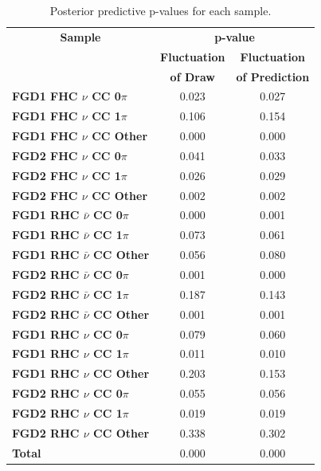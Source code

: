 \begin{center}
\begin{table}
\center
\begin{tabular}{l||c c}
\hline \hline
\multicolumn{1}{c||}{\textbf{Sample}} & \multicolumn{2}{c}{\textbf{p-value}} \\
& \multicolumn{1}{c}{\textbf{Fluctuation}} & \multicolumn{1}{c}{\textbf{Fluctuation}} \\
& \multicolumn{1}{c}{\textbf{of Draw}} & \multicolumn{1}{c}{\textbf{of Prediction}} \\
\hline\hline
\textbf{FGD1 FHC $\nu$ CC 0$\pi$} & 0.023 & 0.027\\ 
\textbf{FGD1 FHC $\nu$ CC 1$\pi$} & 0.106 & 0.154\\
\textbf{FGD1 FHC $\nu$ CC Other} & 0.000 & 0.000\\ \hline
\textbf{FGD2 FHC $\nu$ CC 0$\pi$} & 0.041 & 0.033\\ 
\textbf{FGD2 FHC $\nu$ CC 1$\pi$} & 0.026 & 0.029\\ 
\textbf{FGD2 FHC $\nu$ CC Other} & 0.002 & 0.002\\ \hline
\textbf{FGD1 RHC $\bar{\nu}$ CC 0$\pi$} & 0.000 & 0.001\\
\textbf{FGD1 RHC $\bar{\nu}$ CC 1$\pi$} & 0.073 & 0.061\\
\textbf{FGD1 RHC $\bar{\nu}$ CC Other} & 0.056 & 0.080\\ \hline
\textbf{FGD2 RHC $\bar{\nu}$ CC 0$\pi$} & 0.001 & 0.000\\
\textbf{FGD2 RHC $\bar{\nu}$ CC 1$\pi$} & 0.187 & 0.143\\
\textbf{FGD2 RHC $\bar{\nu}$ CC Other} & 0.001 & 0.001\\ \hline
\textbf{FGD1 RHC $\nu$ CC 0$\pi$} & 0.079 & 0.060\\
\textbf{FGD1 RHC $\nu$ CC 1$\pi$} & 0.011 & 0.010\\
\textbf{FGD1 RHC $\nu$ CC Other} & 0.203 & 0.153\\ \hline
\textbf{FGD2 RHC $\nu$ CC 0$\pi$} & 0.055 & 0.056\\
\textbf{FGD2 RHC $\nu$ CC 1$\pi$} & 0.019 & 0.019\\
\textbf{FGD2 RHC $\nu$ CC Other} & 0.338 & 0.302\\ \hline
\textbf{Total} & 0.000 & 0.000 \\ \hline\hline
\end{tabular}
\caption{Posterior predictive p-values for each sample.}
\label{tab:pval}
\end{table}
\end{center}

